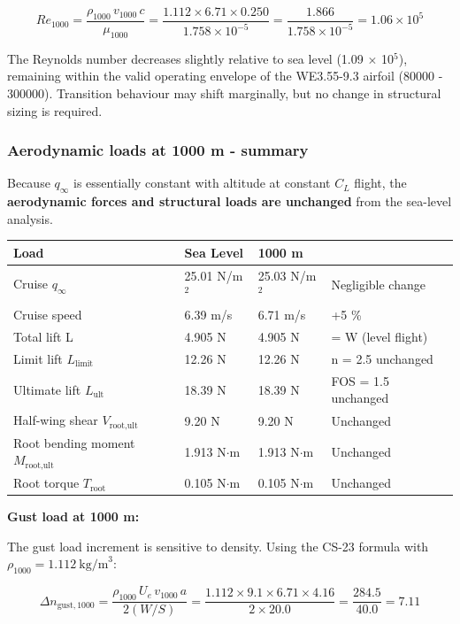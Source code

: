 \documentclass[10pt,a4paper]{article}
\begin{document}
\[
Re_{1000} = \frac{\rho_{1000}\,v_{1000}\,c}{\mu_{1000}} = \frac{1.112 \times 6.71 \times 0.250}{1.758 \times 10^{-5}} = \frac{1.866}{1.758 \times 10^{-5}} = 1.06 \times 10^5
\]

The Reynolds number decreases slightly relative to sea level (1.09 ${\times}$ 10$^{5}$), remaining within the valid operating envelope of the WE3.55-9.3 airfoil (80000 - 300000). Transition behaviour may shift marginally, but no change in structural sizing is required.


\subsubsection{Aerodynamic loads at 1000 m - summary}


Because $q_\infty$ is essentially constant with altitude at constant $C_L$ flight, the \textbf{aerodynamic forces and structural loads are unchanged} from the sea-level analysis.

\begin{center}
\begin{tabular}{|l|l|l|l|}
\hline
Load & Sea Level & 1000 m &  \\
\hline
Cruise $q_\infty$ & 25.01 N/m$^{2}$ & 25.03 N/m$^{2}$ & Negligible change \\
\hline
Cruise speed & 6.39 m/s & 6.71 m/s & +5 \% \\
\hline
Total lift L & 4.905 N & 4.905 N & = W (level flight) \\
\hline
Limit lift $L_{\text{limit}}$ & 12.26 N & 12.26 N & n = 2.5 unchanged \\
\hline
Ultimate lift $L_{\text{ult}}$ & 18.39 N & 18.39 N & FOS = 1.5 unchanged \\
\hline
Half-wing shear $V_{\text{root,ult}}$ & 9.20 N & 9.20 N & Unchanged \\
\hline
Root bending moment $M_{\text{root,ult}}$ & 1.913 N${\cdot}$m & 1.913 N${\cdot}$m & Unchanged \\
\hline
Root torque $T_{\text{root}}$ & 0.105 N${\cdot}$m & 0.105 N${\cdot}$m & Unchanged \\
\hline
\end{tabular}
\end{center}

\textbf{Gust load at 1000 m:}

The gust load increment is sensitive to density. Using the CS-23 formula with $\rho_{1000} = 1.112\ \text{kg/m}^3$:

\[
\Delta n_{\text{gust},1000} = \frac{\rho_{1000}\,U_e\,v_{1000}\,a}{2(W/S)} = \frac{1.112 \times 9.1 \times 6.71 \times 4.16}{2 \times 20.0} = \frac{284.5}{40.0} = 7.11
\]
\end{document}
